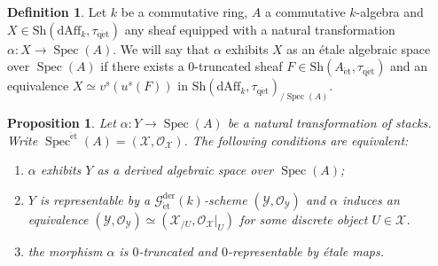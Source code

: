 \documentclass[12pt,a4paper,reqno]{amsart}
\theoremstyle{plain}
\newtheorem{prop}[thm]{Proposition}
\theoremstyle{definition}
\newtheorem{defin}[thm]{Definition}
\theoremstyle{remark}
\numberwithin{equation}{section}
\begin{document}
\begin{defin}
	Let $k$ be a commutative ring, $A$ a commutative $k$-algebra and $X \in {\mathrm{Sh}}(\mathrm{dAff}_k, {\tau_\mathrm{q\acute{e}t}})$ any sheaf equipped with a natural transformation $\alpha \colon X \to \operatorname{Spec}(A)$. We will say that $\alpha$ exhibits $X$ as an \'etale algebraic space over $\operatorname{Spec}(A)$ if there exists a $0$-truncated sheaf $F \in {\mathrm{Sh}}(A_{\mathrm{\acute{e}t}}, {\tau_\mathrm{q\acute{e}t}})$ and an equivalence $X \simeq v^s(u^s(F))$ in ${\mathrm{Sh}}(\mathrm{dAff}_k, {\tau_\mathrm{q\acute{e}t}})_{/\operatorname{Spec}(A)}$.
\end{defin}

{\ignorespaces}

\begin{prop} \label{prop:algebraic_spaces}
	Let $\alpha \colon Y \to \operatorname{Spec}(A)$ be a natural transformation of stacks.
	Write $\operatorname{Spec}^{\mathrm{\acute{e}t}}(A) = ({\mathcal X}, {\mathcal O}_{\mathcal X})$.
	The following conditions are equivalent:
	\begin{enumerate}
		\item $\alpha$ exhibits $Y$ as a derived algebraic space over $\operatorname{Spec}(A)$;
		\item $Y$ is representable by a ${{\mathcal G}_{\mathrm{\acute{e}t}}^\mathrm{der}(k)}$-scheme $({\mathcal Y}, {\mathcal O}_{\mathcal Y})$ and $\alpha$ induces an equivalence $({\mathcal Y}, {\mathcal O}_{\mathcal Y}) \simeq ({\mathcal X}_{/U}, {\mathcal O}_{\mathcal X} |_U)$ for some discrete object $U \in {\mathcal X}$.
		\item the morphism $\alpha$ is $0$-truncated and $0$-representable by \'etale maps.
	\end{enumerate}
\end{prop}
\end{document}
